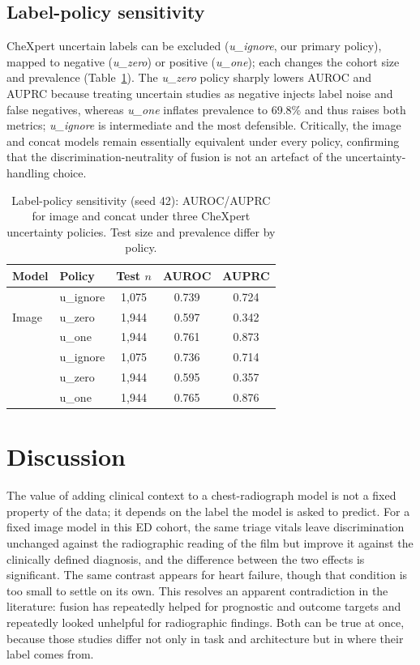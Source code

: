 \documentclass[twocolumn, final]{svjour3}
\begin{document}
\subsection{Label-policy sensitivity}
\label{subsec:labelpol}
CheXpert uncertain labels can be excluded (\emph{u\_ignore}, our primary policy),
mapped to negative (\emph{u\_zero}) or positive (\emph{u\_one}); each changes the
cohort size and prevalence (Table~\ref{tab:labelpol}). The \emph{u\_zero} policy
sharply lowers AUROC and AUPRC because treating uncertain studies as negative
injects label noise and false negatives, whereas \emph{u\_one} inflates prevalence
to 69.8\% and thus raises both metrics; \emph{u\_ignore} is intermediate and the
most defensible. Critically, the image and concat models remain essentially
equivalent under every policy, confirming that the discrimination-neutrality of
fusion is not an artefact of the uncertainty-handling choice.

\begin{table}[t]
\centering
\caption{Label-policy sensitivity (seed 42): AUROC/AUPRC for image and concat under
three CheXpert uncertainty policies. Test size and prevalence differ by policy.}
\label{tab:labelpol}
\begin{tabular}{@{}llccc@{}}
\toprule
Model & Policy & Test $n$ & AUROC & AUPRC \\
\midrule
\multirow{3}{*}{Image}
 & u\_ignore & 1{,}075 & 0.739 & 0.724 \\
 & u\_zero   & 1{,}944 & 0.597 & 0.342 \\
 & u\_one    & 1{,}944 & 0.761 & 0.873 \\
\addlinespace
\multirow{3}{*}{Concat}
 & u\_ignore & 1{,}075 & 0.736 & 0.714 \\
 & u\_zero   & 1{,}944 & 0.595 & 0.357 \\
 & u\_one    & 1{,}944 & 0.765 & 0.876 \\
\bottomrule
\end{tabular}
\end{table}

\section{Discussion}
\label{sec:discussion}
The value of adding clinical context to a chest-radiograph model is not a fixed property
of the data; it depends on the label the model is asked to predict. For a fixed image model
in this ED cohort, the same triage vitals leave discrimination unchanged against the
radiographic reading of the film but improve it against the clinically defined diagnosis,
and the difference between the two effects is significant. The same contrast appears for
heart failure, though that condition is too small to settle on its own. This resolves an
apparent contradiction in the literature: fusion has repeatedly helped for prognostic and
outcome targets and repeatedly looked unhelpful for radiographic findings. Both can be true
at once, because those studies differ not only in task and architecture but in where their
label comes from.
\end{document}
